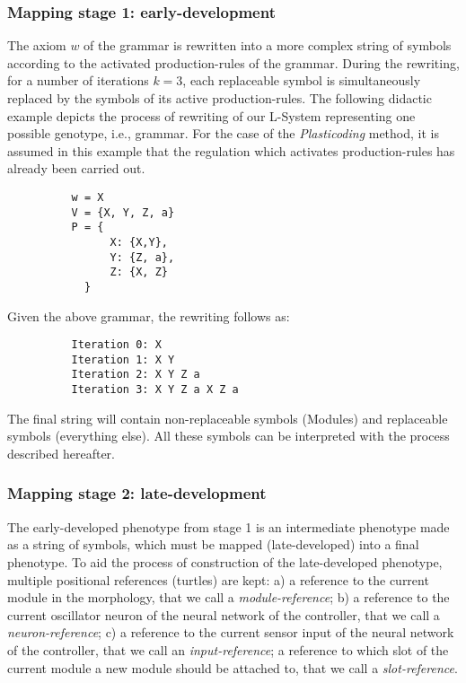 \documentclass[utf8]{frontiersSCNS} %
\begin{document}
\subsubsection{Mapping stage 1: early-development}
 
The axiom $w$ of the grammar is rewritten into a more complex string of symbols according to the activated production-rules of the grammar. During the rewriting, for a number of iterations $k=3$, each replaceable symbol is simultaneously replaced by the symbols of its active production-rules. The following didactic example depicts the process of rewriting of our L-System representing one possible genotype, i.e., grammar. For the case of the \textit{Plasticoding} method, it is assumed in this example that the regulation which activates production-rules has already been carried out.

    \begin{lstlisting}
          w = X 
          V = {X, Y, Z, a}
          P = {  
                X: {X,Y},  
                Y: {Z, a},  
                Z: {X, Z}  
            }
    \end{lstlisting}
  
Given the above grammar, the rewriting follows as: 
  
\begin{lstlisting}
          Iteration 0: X 
          Iteration 1: X Y 
          Iteration 2: X Y Z a 
          Iteration 3: X Y Z a X Z a
\end{lstlisting}
 
The final string will contain non-replaceable symbols (Modules) and replaceable symbols (everything else). All these symbols can be interpreted with the process described hereafter.
 
\subsubsection{Mapping stage 2: late-development}
\label{ref:maplatedev}
 
The early-developed phenotype from stage 1 is an intermediate phenotype made as a string of symbols, which must be mapped (late-developed) into a final phenotype. To aid the process of construction of the late-developed phenotype, multiple positional references (turtles) are kept: a) a reference to the current module in the morphology, that we call a \textit{module-reference}; b) a reference to the current oscillator neuron of the neural network of the controller, that we call a \textit{neuron-reference}; c) a reference to the current sensor input of the neural network of the controller, that we call an \textit{input-reference}; a reference to which slot of the current module a new module should be attached to, that we call a \textit{slot-reference}. 
\end{document}
